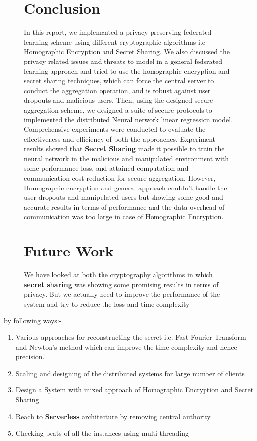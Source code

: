 \documentclass[conference]{IEEEtran}
\begin{document}
\begin{figure}
\section{Conclusion}
In this report, we implemented a privacy-preserving federated learning scheme using different cryptographic algorithms i.e. Homographic Encryption and Secret Sharing. We also discussed the privacy related issues and threats to model in a general federated learning approach and tried to use the homographic encryption and secret sharing techniques, which can force the central server to conduct the aggregation operation, and is robust against user dropouts and malicious users. Then, using the designed secure aggregation scheme, we designed a suite of secure protocols to implemented the distributed Neural network linear regression model. Comprehensive experiments were conducted to evaluate the effectiveness and efficiency of both the approaches. Experiment results showed that \textbf{Secret Sharing} made it possible to train the neural network in the malicious and manipulated environment with some performance loss, and attained computation and communication cost reduction for secure aggregation. However, Homographic encryption and general approach couldn't handle the user dropouts and manipulated users but showing some good and accurate results in terms of performance and the data-overhead of communication was too large in case of Homographic Encryption. 

\section{Future Work}

We have looked at both the cryptography algorithms in which \textbf{secret sharing} was showing some promising results in terms of privacy. But we actually need to improve the performance of the system and try to reduce the loss and time complexity 



\end{figure}

by following ways:-

\begin{enumerate}
    \item Various approaches for reconstructing the secret i.e. Fast Fourier Transform and Newton's method which can improve the time complexity and hence precision. 
    \item Scaling and designing of the distributed systems for large number of clients
    \item Design a System with mixed approach of Homographic Encryption and Secret Sharing
    \item Reach to \textbf{Serverless} architecture by removing central authority
    \item Checking beats of all the instances using multi-threading
\end{enumerate}
\end{document}
